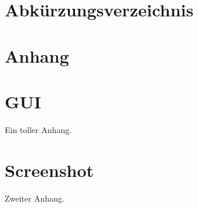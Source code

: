 \documentclass[12pt,a4paper, listof=entryprefix, bibliography=totocnumbered,toc=listofnumbered,lof=listofnumbered]{scrartcl}
\newcounter{verzeichnis}
\begin{document}
	\listoftables
	\pagebreak
	
	\section{Abkürzungsverzeichnis}
	\vspace{-6em} %
	\printnoidxglossary[type=\acronymtype,style=alttree,title=,toctitle=] %
	\newpage

\setcounter{page}{1}  %
\begin{appendix}
	 \label{Anhang}
	\section*{Anhang} %
	\renewcommand{\thesection}{\Roman{section}}
	
	\setcounter{section}{0} %
	\section{GUI}
	\label{app:gui}
	Ein toller Anhang.
	
	\section{Screenshot}
	\label{app:screenshot}
	Zweiter Anhang.
\end{appendix}
\end{document}
